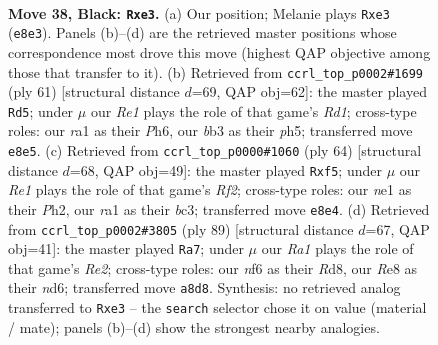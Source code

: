 \documentclass[11pt]{article}
\begin{document}
\clearpage

\begin{figure}[p]\centering
\begin{subfigure}{0.46\textwidth}\centering
\resizebox{\linewidth}{!}{%
\newchessgame
\chessboard[
  setfen={r3r3/1kP5/p4N2/1b3p2/7R/1B2P3/1P4P1/R2KN3 b - - 0 38},
  showmover=false,
  pgfstyle=straightmove, color=movearrow, markmove={e8-e3}
]}
\caption{}
\end{subfigure}\hfill
\begin{subfigure}{0.46\textwidth}\centering
\resizebox{\linewidth}{!}{%
\newchessgame
\chessboard[
  setfen={r2r4/6pk/1RN2b1p/5p1P/3P4/7n/PP1B4/1K1R4 b - - 6 31},
  showmover=false,
  pgfstyle=straightmove, color=movearrow, markmove={d8-d5}
]}
\caption{}
\end{subfigure}
\\[4pt]
\begin{subfigure}{0.46\textwidth}\centering
\resizebox{\linewidth}{!}{%
\newchessgame
\chessboard[
  setfen={5r1k/2B4p/p3r3/5p2/6n1/2b3N1/P1P2R1P/5RK1 w - - 0 33},
  showmover=false,
  pgfstyle=straightmove, color=movearrow, markmove={f2-f5}
]}
\caption{}
\end{subfigure}\hfill
\begin{subfigure}{0.46\textwidth}\centering
\resizebox{\linewidth}{!}{%
\newchessgame
\chessboard[
  setfen={3r1k2/4rp1p/1p1Nb3/4P3/P2P4/2R5/5RK1/8 b - - 0 45},
  showmover=false,
  pgfstyle=straightmove, color=movearrow, markmove={e7-a7}
]}
\caption{}
\end{subfigure}
\caption{\textbf{Move 38, Black: \texttt{Rxe3}.} (a) Our position; Melanie plays \texttt{Rxe3} (\texttt{e8e3}). Panels (b)--(d) are the retrieved master positions whose correspondence most drove this move (highest QAP objective among those that transfer to it). (b) Retrieved from \texttt{ccrl\_top\_p0002\#1699} (ply 61) [structural distance $d$=69, QAP obj=62]: the master played \texttt{Rd5}; under $\mu$ our \emph{Re1} plays the role of that game's \emph{Rd1}; cross-type roles: our \emph{r}a1 as their \emph{P}h6, our \emph{b}b3 as their \emph{p}h5; transferred move \texttt{e8e5}. (c) Retrieved from \texttt{ccrl\_top\_p0000\#1060} (ply 64) [structural distance $d$=68, QAP obj=49]: the master played \texttt{Rxf5}; under $\mu$ our \emph{Re1} plays the role of that game's \emph{Rf2}; cross-type roles: our \emph{n}e1 as their \emph{P}h2, our \emph{r}a1 as their \emph{b}c3; transferred move \texttt{e8e4}. (d) Retrieved from \texttt{ccrl\_top\_p0002\#3805} (ply 89) [structural distance $d$=67, QAP obj=41]: the master played \texttt{Ra7}; under $\mu$ our \emph{Ra1} plays the role of that game's \emph{Re2}; cross-type roles: our \emph{n}f6 as their \emph{R}d8, our \emph{R}e8 as their \emph{n}d6; transferred move \texttt{a8d8}. Synthesis: no retrieved analog transferred to \texttt{Rxe3} -- the \texttt{search} selector chose it on value (material / mate); panels (b)--(d) show the strongest nearby analogies.}
\label{fig:thought-m75}
\end{figure}
\end{document}
